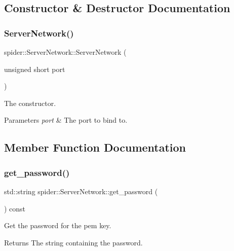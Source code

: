 \subsection{Constructor \& Destructor Documentation}
\mbox{\label{classspider_1_1_server_network_af115121ee56f135db6ae6a2f9c24e6fc}} 
\subsubsection{Server\+Network()}
{\footnotesize\ttfamily spider\+::\+Server\+Network\+::\+Server\+Network (\begin{DoxyParamCaption}\item[{unsigned short}]{port }\end{DoxyParamCaption})}



The constructor. 


\begin{DoxyParams}{Parameters}
{\em port} & The port to bind to. \\
\hline
\end{DoxyParams}


\subsection{Member Function Documentation}
\mbox{\label{classspider_1_1_server_network_af177fc329a2be83ada20a9988025a7cd}} 
\subsubsection{get\+\_\+password()}
{\footnotesize\ttfamily std\+::string spider\+::\+Server\+Network\+::get\+\_\+password (\begin{DoxyParamCaption}{ }\end{DoxyParamCaption}) const}



Get the password for the pem key. 

\begin{DoxyReturn}{Returns}
The string containing the password. 
\end{DoxyReturn}
\mbox{\label{classspider_1_1_server_network_a94a88f381fb5ab7c6f779615d14ebbb9}} 
